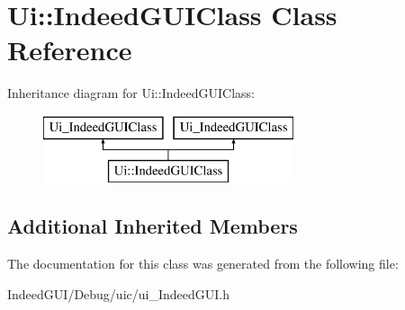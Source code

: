 \hypertarget{class_ui_1_1_indeed_g_u_i_class}{}\section{Ui\+:\+:Indeed\+G\+U\+I\+Class Class Reference}
\label{class_ui_1_1_indeed_g_u_i_class}
Inheritance diagram for Ui\+:\+:Indeed\+G\+U\+I\+Class\+:\begin{figure}[H]
\begin{center}
\leavevmode
\includegraphics[height=2.000000cm]{class_ui_1_1_indeed_g_u_i_class}
\end{center}
\end{figure}
\subsection*{Additional Inherited Members}


The documentation for this class was generated from the following file\+:\begin{DoxyCompactItemize}
\item 
Indeed\+G\+U\+I/\+Debug/uic/ui\+\_\+\+Indeed\+G\+U\+I.\+h\end{DoxyCompactItemize}
